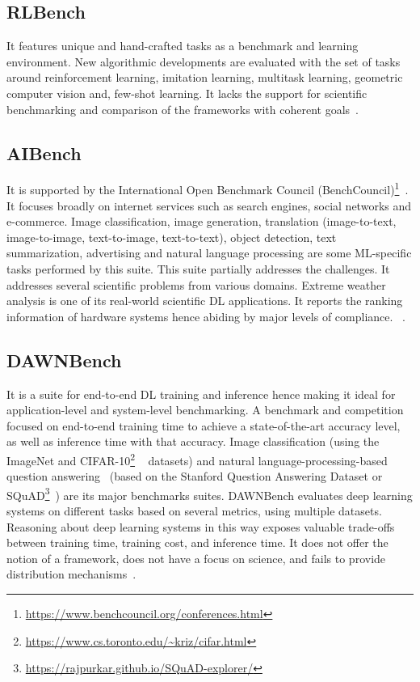 \documentclass[a4paper,UKenglish,cleveref, autoref, thm-restate]{lipics-v2021}
\begin{document}
    \subsection{ RLBench}
    \label{rlbench}
    It features unique and hand-crafted tasks as a benchmark and learning environment. 	New algorithmic
developments are evaluated with the set of tasks around reinforcement learning,
imitation learning, multitask learning,
geometric computer vision and,
few-shot learning.
It lacks the support for scientific benchmarking and comparison of the frameworks with coherent goals~\cite{sctmlb}.


\subsection{AIBench}
\label{AIbench}
It is
supported by the International Open
Benchmark Council (BenchCouncil)\footnote{\url{https://www.benchcouncil.org/conferences.html}}~\cite{RefWorkaiBenchmark}.
It focuses broadly on internet services such as search engines, social networks and e-commerce. Image classification, image generation, translation (image-to-text, image-to-image, text-to-image, text-to-text), object detection, text summarization, advertising and natural language processing are some ML-specific tasks performed by this suite. This suite partially addresses the challenges. It addresses several scientific problems from various domains. Extreme weather analysis is one of its real-world scientific DL applications. It reports the ranking information of hardware systems hence abiding by major levels of compliance.
~\cite{sctmlb}.
\subsection{DAWNBench}
\label{Dawnbench}
It is a suite for end-to-end DL training and inference hence making it ideal for application-level and system-level benchmarking. A benchmark and competition focused on end-to-end training time to achieve a state-of-the-art accuracy level, as well as inference time with that accuracy. Image classification (using the ImageNet and CIFAR-10\footnote{\url{https://www.cs.toronto.edu/~kriz/cifar.html}} ~\cite{RefWorksdawnBench:} datasets) and natural language-processing-based question answering~\cite{RefWorksdawnBench:} (based on the Stanford Question Answering Dataset or SQuAD\footnote{\url{https://rajpurkar.github.io/SQuAD-explorer/}}~\cite{RefWorksdawnBench:}) are its major benchmarks suites. DAWNBench evaluates deep learning systems on different tasks based on several metrics, using multiple datasets. Reasoning about deep learning systems in this way exposes valuable trade-offs between training time, training cost, and inference time.
It does not offer the notion of a framework, does not have a focus on science, and fails to provide distribution mechanisms~\cite{RefWorksdawnBench:}.
\end{document}

